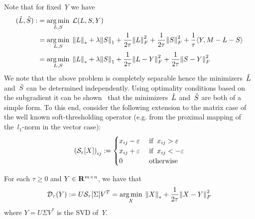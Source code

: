 \documentclass{../../common/projectreport}
\begin{document}
Note that for fixed~$Y$ we have
%
\begin{align}
\begin{split}
({\hat{L}},{\hat{S}}) :&= \operatorname*{arg\,min}_{L,S} \; {\mathcal{L}}(L,S,Y) \\
&= \operatorname*{arg\,min}_{L,S} \; {\left\|L\right\|}_{*}^{} + \lambda {\left\|S\right\|}_{1}^{} + \frac{1}{2\tau} {\left\|L\right\|}_{F}^{2} + \frac{1}{2\tau} {\left\|S\right\|}_{F}^{2} + \frac{1}{\tau} \langle Y, M-L-S \rangle \\
&= \operatorname*{arg\,min}_{L,S} \; {\left\|L\right\|}_{*}^{} + \lambda {\left\|S\right\|}_{1}^{} + \frac{1}{2\tau} {\left\|L-Y\right\|}_{F}^{2} + \frac{1}{2\tau} {\left\|S-Y\right\|}_{F}^{2}
\end{split}
\label{Algorithms:MainAlgs:ITM:ArgminLagr}
\end{align}
%
We note that the above problem is completely separable hence the minimizers~${\hat{L}}$ and~${\hat{S}}$ can be determined independently. Using optimality conditions based on the subgradient it can be shown~\cite{Cai:2010uq,Wright:2009fk} that the minimizers~${\hat{L}}$ and~${\hat{S}}$ are both of a simple form. To this end, consider the following 
extension to the matrix case of the well known soft-thresholding operator (e.g. from the proximal mapping of the~$l_1$-norm in the vector case):
%
\begin{align}
\left({\mathcal{S}}_\varepsilon[X]\right)_{ij} := \begin{cases} x_{ij}-\varepsilon & \text{ if} \;\; x_{ij}>\varepsilon \\ x_{ij}+\varepsilon & \text{ if} \;\; x_{ij}<-\varepsilon \\ 0 & \text{ otherwise} \end{cases}
\label{Algorithms:MainAlgs:ITM:Shrink}
\end{align}


\begin{theorem}
For each $\tau \geq 0$ and $Y\in {\mathbf R}^{m\times n}$, we have that
\begin{align}
{\mathcal{D}}_\tau(Y) := U {\mathcal{S}}_\tau[\Sigma] V^T = \operatorname*{arg\,min}_X \; {\left\|X\right\|}_{*}^{} + \frac{1}{2\tau} {\left\|X-Y\right\|}_{F}^{2}
\label{Algorithms:MainAlgs:ITM:SVTtheore:eq}
\end{align}
where $Y = U\Sigma V^*$ is the SVD of~$Y$.
\label{Algorithms:MainAlgs:ITM:SVTtheorem}
\end{theorem}
\end{document}
